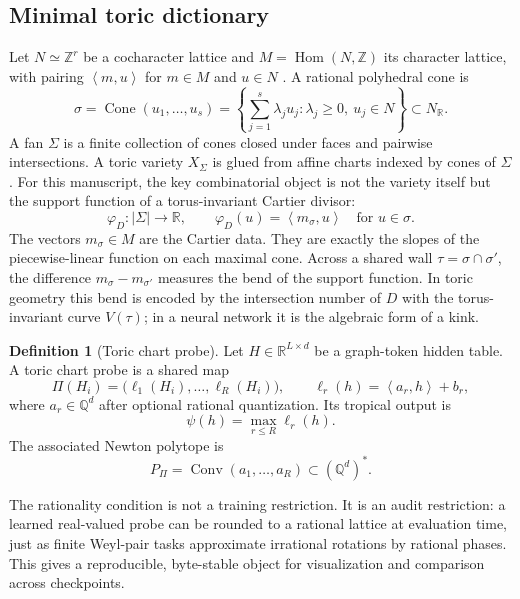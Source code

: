 \documentclass[11pt]{article}
\theoremstyle{definition}
\newtheorem{definition}{Definition}[section]
\theoremstyle{plain}
\theoremstyle{remark}
\numberwithin{equation}{section}
\newcommand{\R}{\mathbb{R}}
\newcommand{\Z}{\mathbb{Z}}
\newcommand{\Q}{\mathbb{Q}}
\newcommand{\Conv}{\operatorname{Conv}}
\newcommand{\ip}[2]{\left\langle #1,#2\right\rangle}
\begin{document}
\subsection{Minimal toric dictionary}

Let $N\simeq \Z^r$ be a cocharacter lattice and $M=\operatorname{Hom}(N,\Z)$ its character lattice, with pairing $\ip{m}{u}$ for $m\in M$ and $u\in N$ \cite{cox2011toric}.  A rational polyhedral cone is
\begin{equation}
  \sigma=\operatorname{Cone}(u_1,\ldots,u_s)
  =\left\{\sum_{j=1}^s\lambda_j u_j:\lambda_j\ge0,\ u_j\in N\right\}\subset N_\R.
\end{equation}
A fan $\Sigma$ is a finite collection of cones closed under faces and pairwise intersections.  A toric variety $X_\Sigma$ is glued from affine charts indexed by cones of $\Sigma$.  For this manuscript, the key combinatorial object is not the variety itself but the support function of a torus-invariant Cartier divisor:
\begin{equation}
  \varphi_D:|\Sigma|\to\R,\qquad
  \varphi_D(u)=\ip{m_\sigma}{u}\quad\text{for }u\in\sigma.
\end{equation}
The vectors $m_\sigma\in M$ are the Cartier data.  They are exactly the slopes of the piecewise-linear function on each maximal cone.  Across a shared wall $\tau=\sigma\cap\sigma'$, the difference $m_\sigma-m_{\sigma'}$ measures the bend of the support function.  In toric geometry this bend is encoded by the intersection number of $D$ with the torus-invariant curve $V(\tau)$; in a neural network it is the algebraic form of a kink.

\begin{definition}[Toric chart probe]
Let $H\in\R^{L\times d}$ be a graph-token hidden table.  A toric chart probe is a shared map
\begin{equation}
  \Pi(H_i)=\bigl(\ell_1(H_i),\ldots,\ell_R(H_i)\bigr),\qquad
  \ell_r(h)=\ip{a_r}{h}+b_r,
\end{equation}
where $a_r\in\Q^d$ after optional rational quantization.  Its tropical output is
\begin{equation}
  \psi(h)=\max_{r\le R}\ell_r(h).
\end{equation}
The associated Newton polytope is
\begin{equation}
  P_\Pi=\Conv(a_1,\ldots,a_R)\subset(\Q^d)^\ast.
\end{equation}
\end{definition}

The rationality condition is not a training restriction.  It is an audit restriction: a learned real-valued probe can be rounded to a rational lattice at evaluation time, just as finite Weyl-pair tasks approximate irrational rotations by rational phases.  This gives a reproducible, byte-stable object for visualization and comparison across checkpoints.
\end{document}

